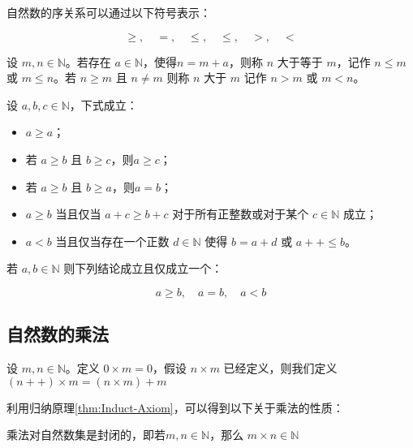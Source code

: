 自然数的序关系可以通过以下符号表示：

$$
\ge,\quad =,\quad\le,\quad\le,\quad >,\quad <
$$

\begin{definition}[自然数的序]
	设 $m,n\in \mathbb N$。若存在 $a\in \mathbb N$，使得$n=m+a$，则称 $n$ 大于等于 $m$，记作 $n\le m$ 或 $m\le n$。若 $n\ge m$ 且 $n\ne m$ 则称 $n$ 大于 $m$ 记作 $n > m$ 或 $m < n$。
\end{definition}

\begin{theorem}[序的基本性质]
	设 $a,b,c\in \mathbb N$，下式成立：
	\begin{itemize}
		\item $a\ge a$；
		\item 若 $a\ge b$ 且 $b \ge c$，则$a\ge c$；
		\item 若 $a\ge b$ 且 $b \ge a$，则$a=b$；
		\item $a \ge b$ 当且仅当 $a+c\ge b+c$ 对于所有正整数或对于某个 $c\in \mathbb N$ 成立；
		\item $a < b$ 当且仅当存在一个正数 $d\in \mathbb N$ 使得 $b=a+d$ 或 $a++\le b$。
	\end{itemize}
\end{theorem}

\begin{theorem}[三奇性]
	若 $a,b\in \mathbb N$ 则下列结论成立且仅成立一个：
	
	$$
	a\ge b,\quad a=b, \quad a<b
	$$
\end{theorem}


\subsection{自然数的乘法}

\begin{definition}
	设 $m,n \in \mathbb N$。定义 $0 \times m = 0$，假设 $n\times m$ 已经定义，则我们定义 $(n++)\times m = (n\times m) + m$
\end{definition}


利用归纳原理\ref{thm:Induct-Axiom}，可以得到以下关于乘法的性质：

\begin{theorem}[乘法的封闭性]
	乘法对自然数集是封闭的，即若$m,n\in \mathbb N$，那么 $m\times n\in \mathbb N$
\end{theorem}

